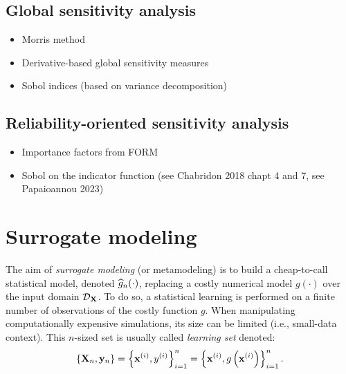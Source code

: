 
\subsection{Global sensitivity analysis}

\begin{itemize}
    \item Morris method
    \item Derivative-based global sensitivity measures
    \item Sobol indices (based on variance decomposition)
\end{itemize}

\subsection{Reliability-oriented sensitivity analysis}

\begin{itemize}
    \item Importance factors from FORM 
    \item Sobol on the indicator function (see Chabridon 2018 chapt 4 and 7, see Papaioannou 2023)
\end{itemize}



\newpage
\section{Surrogate modeling}
The aim of \textit{surrogate modeling} (or metamodeling) is to build a cheap-to-call statistical model, denoted $\widehat{g}_n(\cdot)$, replacing a costly numerical model $g(\cdot)$ over the input domain $\mathcal{D}_{{\bf X}}$. 
To do so, a statistical learning is performed on a finite number of observations of the costly function $g$. 
When manipulating computationally expensive simulations, its size can be limited (i.e., small-data context). 
This $n$-sized set is usually called \textit{learning set} denoted: 
\begin{equation}
    \left\{{\bf X}_n, {\bf y}_n\right\} = \left\{{\bf x}^{(i)}, y^{(i)}\right\}_{i=1}^n
                                = \left\{{\bf x}^{(i)}, g\left({\bf x}^{(i)}\right)\right\}_{i=1}^n.    
\end{equation}

